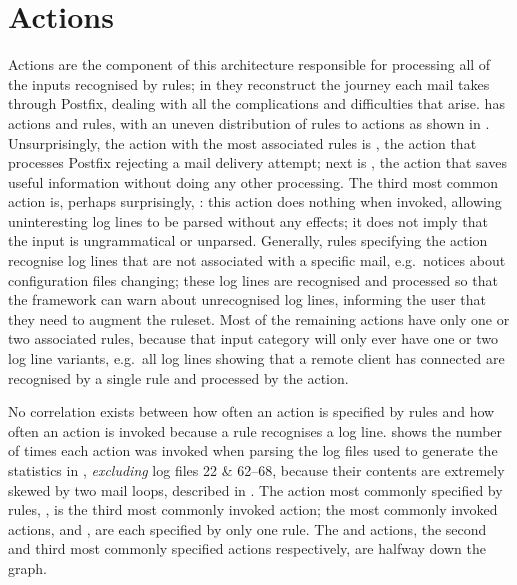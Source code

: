 \section{Actions}

\label{actions in implementation}

Actions are the component of this architecture responsible for processing
all of the inputs recognised by rules; in \parsername{} they reconstruct
the journey each mail takes through Postfix, dealing with all the
complications and difficulties that arise.  \parsername{} has
\numberOFactions{} actions and \numberOFrules{} rules, with an uneven
distribution of rules to actions as shown in .  Unsurprisingly, the action with the most associated
rules is , the action that processes Postfix
rejecting a mail delivery attempt; next is , the action
that saves useful information without doing any other processing.  The
third most common action is, perhaps surprisingly, :
this action does nothing when invoked, allowing uninteresting log lines to
be parsed without any effects; it does not imply that the input is
ungrammatical or unparsed.  Generally, rules specifying the
 action recognise log lines that are not associated
with a specific mail, e.g.\ notices about configuration files changing;
these log lines are recognised and processed so that the framework can warn
about unrecognised log lines, informing the user that they need to augment
the ruleset.  Most of the remaining actions have only one or two associated
rules, because that input category will only ever have one or two log line
variants, e.g.\ all log lines showing that a remote client has connected
are recognised by a single rule and processed by the 
action.

No correlation exists between how often an action is specified by rules and
how often an action is invoked because a rule recognises a log line.
shows the number of times each action was invoked when parsing the
\numberOFlogFILES{} log files used to generate the statistics in
, \textit{excluding\/} log files 22 \&
62--68, because their contents are extremely skewed by two mail loops,
described in .  The action
most commonly specified by rules, , is the third
most commonly invoked action; the most commonly invoked actions,
 and , are each specified by only one
rule.  The  and  actions, the
second and third most commonly specified actions respectively, are halfway
down the graph.

